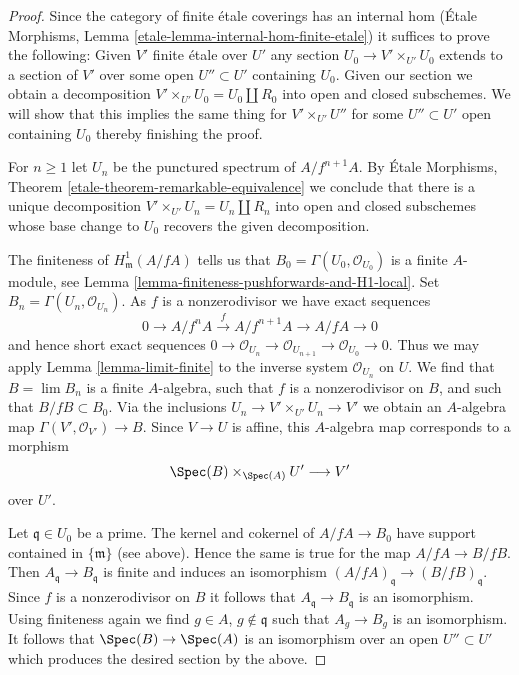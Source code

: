 \begin{proof}
Since the category of finite \'etale coverings has an internal hom
(\'Etale Morphisms, Lemma \ref{etale-lemma-internal-hom-finite-etale})
it suffices to prove the following: Given $V'$ finite \'etale over $U'$
any section $U_0 \to V' \times_{U'} U_0$ extends to a section of $V'$
over some open $U'' \subset U'$ containing $U_0$.
Given our section we obtain a decomposition
$V' \times_{U'} U_0 = U_0 \amalg R_0$ into open and closed subschemes.
We will show that this implies the same thing for $V' \times_{U'} U''$
for some $U'' \subset U'$ open containing $U_0$ thereby
finishing the proof.

\medskip\noindent
For $n \geq 1$ let $U_n$ be the punctured spectrum of $A/f^{n + 1}A$. By
\'Etale Morphisms, Theorem \ref{etale-theorem-remarkable-equivalence}
we conclude that there is a unique decomposition
$V' \times_{U'} U_n = U_n \amalg R_n$
into open and closed subschemes whose base change to $U_0$ recovers
the given decomposition.

\medskip\noindent
The finiteness of $H^1_\mathfrak m(A/fA)$ tells us that
$B_0 = \Gamma(U_0, \mathcal{O}_{U_0})$ is a finite $A$-module, see
Lemma \ref{lemma-finiteness-pushforwards-and-H1-local}.
Set $B_n = \Gamma(U_n, \mathcal{O}_{U_n})$.
As $f$ is a nonzerodivisor we have exact sequences
$$
0 \to A/f^nA \xrightarrow{f} A/f^{n + 1}A \to A/fA \to 0
$$
and hence short exact sequences $0 \to \mathcal{O}_{U_n} \to
\mathcal{O}_{U_{n + 1}} \to \mathcal{O}_{U_0} \to 0$.
Thus we may apply Lemma \ref{lemma-limit-finite}
to the inverse system $\mathcal{O}_{U_n}$ on $U$.
We find that $B = \lim B_n$ is a finite $A$-algebra, such that
$f$ is a nonzerodivisor on $B$,
and such that $B/fB \subset B_0$.
Via the inclusions $U_n \to V' \times_{U'} U_n \to V'$
we obtain an $A$-algebra map $\Gamma(V', \mathcal{O}_{V'}) \to B$.
Since $V \to U$ is affine, this $A$-algebra map corresponds to
a morphism
$$
\Spec(B) \times_{\Spec(A)} U' \longrightarrow V'
$$
over $U'$.

\medskip\noindent
Let $\mathfrak q \in U_0$ be a prime. The kernel and cokernel of
$A/fA \to B_0$ have support contained in $\{\mathfrak m\}$ (see above).
Hence the same is true for the map $A/fA \to B/fB$.
Then $A_\mathfrak q \to B_\mathfrak q$ is finite and
induces an isomorphism $(A/fA)_\mathfrak q \to (B/fB)_\mathfrak q$.
Since $f$ is a nonzerodivisor on $B$ it follows that
$A_\mathfrak q \to B_\mathfrak q$ is an isomorphism.
Using finiteness again we find $g \in A$, $g \not \in \mathfrak q$
such that $A_g \to B_g$ is an isomorphism.
It follows that $\Spec(B) \to \Spec(A)$ is an
isomorphism over an open $U'' \subset U'$ which produces
the desired section by the above.
\end{proof}



























